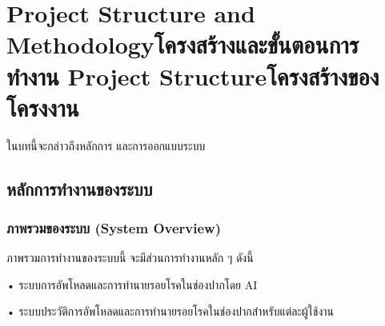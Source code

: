 \chapter{\ifproject%
\ifenglish Project Structure and Methodology\else โครงสร้างและขั้นตอนการทำงาน\fi
\else%
\ifenglish Project Structure\else โครงสร้างของโครงงาน\fi
\fi
}

ในบทนี้จะกล่าวถึงหลักการ และการออกแบบระบบ

\makeatletter


\makeatother

\section{หลักการทำงานของระบบ}


\subsection{ภาพรวมของระบบ (System Overview)}
  
ภาพรวมการทํางานของระบบนี้ จะมีส่วนการทํางานหลัก ๆ ดังนี้

• ระบบการอัพโหลดและการทํานายรอยโรคในช่องปากโดย AI

• ระบบประวัติการอัพโหลดและการทํานายรอยโรคในช่องปากสําหรับแต่ละผู้ใช้งาน

